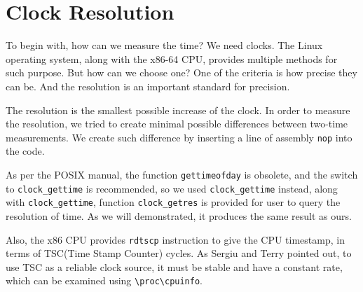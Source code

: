 \section{Clock Resolution}

To begin with, how can we measure the time? We need clocks. The Linux operating system, along with the x86-64 CPU, provides multiple methods for such purpose. But how can we choose one? One of the criteria is how precise they can be. And the resolution is an important standard for precision.

The resolution is the smallest possible increase of the clock. In order to measure the resolution, we tried to create minimal possible differences between two-time measurements. We create such difference by inserting a line of assembly \texttt{nop} into the code. 

As per the POSIX manual\cite{posix-clock-gettime}, the function \texttt{gettimeofday} is obsolete, and the switch to \texttt{clock\_gettime} is recommended, so we used \texttt{clock\_gettime} instead, along with \texttt{clock\_gettime}, function \texttt{clock\_getres} is provided for user to query the resolution of time. As we will demonstrated, it produces the same result as ours.

Also, the x86 CPU provides \texttt{rdtscp} instruction to give the CPU timestamp, in terms of TSC(Time Stamp Counter) cycles. As Sergiu and Terry pointed out, to use TSC as a reliable clock source, it must be stable and have a constant rate, which can be examined using \texttt{\textbackslash{}proc\textbackslash{}cpuinfo}\cite{constant_tsc}.